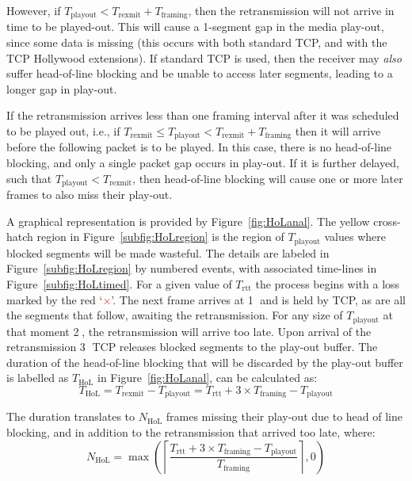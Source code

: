 However, if $T_\mathrm{playout} < T_\mathrm{rexmit} + T_\mathrm{framing}$, then
the retransmission will not arrive in time to be played-out. This will cause a
1-segment gap in the media play-out, since some data is missing (this occurs
with both standard TCP, and with the TCP Hollywood extensions). If standard TCP
is used, then the receiver may \emph{also} suffer head-of-line blocking and be
unable to access later segments, leading to a longer gap in play-out.

If the retransmission arrives less than one framing interval after it was
scheduled to be played out, i.e., if
       $T_\mathrm{rexmit} \leq T_\mathrm{playout}
                          < T_\mathrm{rexmit} + T_\mathrm{framing}$
then it will arrive before the following packet is to be played.  In this case,
there is no head-of-line blocking, and only a single packet gap occurs in
play-out. If it is further delayed, such that $T_\mathrm{playout} <
T_\mathrm{rexmit}$, then head-of-line blocking will cause one or more later
frames to also miss their play-out.

A graphical representation is provided by Figure~\ref{fig:HoLanal}. The  yellow
cross-hatch region in Figure~\ref{subfig:HoLregion} is the region of
$T_\mathrm{playout}$ values where blocked segments will be made wasteful. The
details are labeled in Figure~\ref{subfig:HoLregion} by numbered events, with
associated time-lines in Figure~\ref{subfig:HoLtimed}. For a given value of
$T_\mathrm{rtt}$ the process begins with a loss marked by the red
`\textcolor{red}{$\times$}'. The next frame arrives at \textcircled{1} and is held by TCP,
as are all the segments that follow, awaiting the retransmission. For any size
of $T_\mathrm{playout}$ at that moment \textcircled{2}, the retransmission will arrive too
late. Upon arrival of the retransmission \textcircled{3} TCP releases blocked segments to
the play-out buffer. The duration of the head-of-line blocking that will be
discarded by the play-out buffer is labelled as $T_\mathrm{HoL}$ in
Figure~\ref{fig:HoLanal}, can be calculated as:
\begin{equation}
  T_\mathrm{HoL} = T_\mathrm{rexmit} - T_\mathrm{playout}
                 = T_\mathrm{rtt} + 3 \times T_\mathrm{framing} -
                 T_\mathrm{playout}
\label{eq:t-hol}
\end{equation}

The duration translates to $N_\mathrm{HoL}$ frames missing their play-out due to
head of line blocking, and in addition to the retransmission that arrived too
late, where:
\begin{equation}
  N_\mathrm{HoL} =
    \max\left(
      \left\lceil
      \frac{T_\mathrm{rtt} + 3 \times T_\mathrm{framing} - T_\mathrm{playout}}{T_\mathrm{framing}}
      \right\rceil, 0
    \right)
\label{eq:n-hol}
\end{equation}

